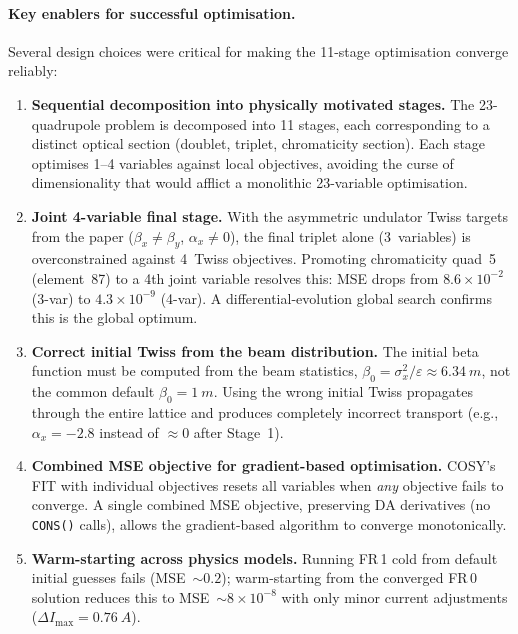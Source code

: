 \documentclass[11pt]{article}
\begin{document}
\paragraph{Key enablers for successful optimisation.}
Several design choices were critical for making the 11-stage optimisation
converge reliably:
\begin{enumerate}
  \item \textbf{Sequential decomposition into physically motivated stages.}
    The 23-quadrupole problem is decomposed into 11 stages, each
    corresponding to a distinct optical section (doublet, triplet,
    chromaticity section).  Each stage optimises 1--4 variables against
    local objectives, avoiding the curse of dimensionality that would
    afflict a monolithic 23-variable optimisation.

  \item \textbf{Joint 4-variable final stage.}
    With the asymmetric undulator Twiss targets from the paper ($\beta_x
    \neq \beta_y$, $\alpha_x \neq 0$), the final triplet alone (3~variables)
    is overconstrained against 4~Twiss objectives.  Promoting chromaticity
    quad~5 (element~87) to a 4th joint variable resolves this: MSE drops
    from $8.6 \times 10^{-2}$ (3-var) to $4.3 \times 10^{-9}$ (4-var).
    A differential-evolution global search confirms this is the global
    optimum.

  \item \textbf{Correct initial Twiss from the beam distribution.}
    The initial beta function must be computed from the beam statistics,
    $\beta_0 = \sigma_x^2 / \varepsilon \approx \SI{6.34}{m}$, not the
    common default $\beta_0 = \SI{1}{m}$.  Using the wrong initial Twiss
    propagates through the entire lattice and produces completely incorrect
    transport (e.g., $\alpha_x = -2.8$ instead of $\approx 0$ after
    Stage~1).

  \item \textbf{Combined MSE objective for gradient-based optimisation.}
    COSY's FIT with individual objectives resets all variables when
    \emph{any} objective fails to converge.  A single combined MSE
    objective, preserving DA derivatives (no \texttt{CONS()} calls),
    allows the gradient-based algorithm to converge monotonically.

  \item \textbf{Warm-starting across physics models.}
    Running FR\,1 cold from default initial guesses fails
    (MSE~$\sim 0.2$); warm-starting from the converged FR\,0 solution
    reduces this to MSE~$\sim 8 \times 10^{-8}$ with only minor current
    adjustments ($\Delta I_\mathrm{max} = \SI{0.76}{A}$).
\end{enumerate}
\end{document}
